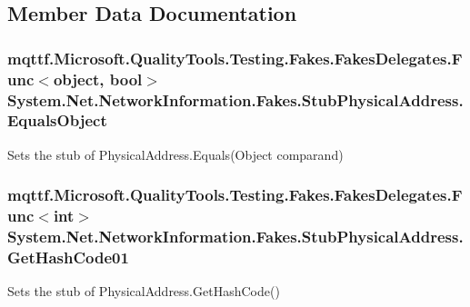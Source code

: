 \subsection{Member Data Documentation}
\hypertarget{class_system_1_1_net_1_1_network_information_1_1_fakes_1_1_stub_physical_address_a016ee9a7cecf8207f4b0a7b9965fcd8c}{
\subsubsection[{Equals\-Object}]{\setlength{\rightskip}{0pt plus 5cm}mqttf.\-Microsoft.\-Quality\-Tools.\-Testing.\-Fakes.\-Fakes\-Delegates.\-Func$<$object, bool$>$ System.\-Net.\-Network\-Information.\-Fakes.\-Stub\-Physical\-Address.\-Equals\-Object}}\label{class_system_1_1_net_1_1_network_information_1_1_fakes_1_1_stub_physical_address_a016ee9a7cecf8207f4b0a7b9965fcd8c}


Sets the stub of Physical\-Address.\-Equals(\-Object comparand)

\hypertarget{class_system_1_1_net_1_1_network_information_1_1_fakes_1_1_stub_physical_address_aa637f4d6efafca0a34340c9e1d7a9bb9}{
\subsubsection[{Get\-Hash\-Code01}]{\setlength{\rightskip}{0pt plus 5cm}mqttf.\-Microsoft.\-Quality\-Tools.\-Testing.\-Fakes.\-Fakes\-Delegates.\-Func$<$int$>$ System.\-Net.\-Network\-Information.\-Fakes.\-Stub\-Physical\-Address.\-Get\-Hash\-Code01}}\label{class_system_1_1_net_1_1_network_information_1_1_fakes_1_1_stub_physical_address_aa637f4d6efafca0a34340c9e1d7a9bb9}


Sets the stub of Physical\-Address.\-Get\-Hash\-Code()

